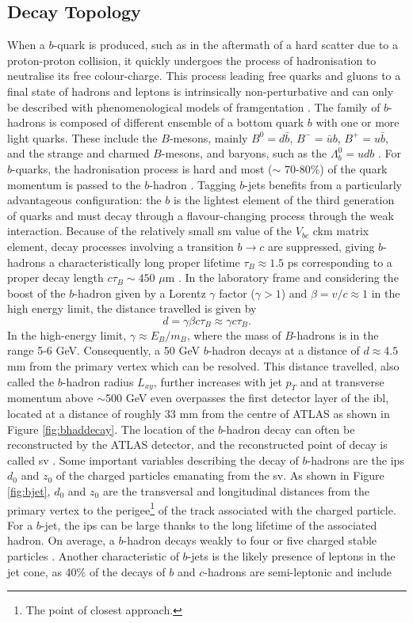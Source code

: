 \subsection{Decay Topology}
When a $b$-quark is produced, such as in the aftermath of a hard scatter due to a proton-proton collision, it quickly undergoes the process of hadronisation to neutralise its free colour-charge. This process leading free quarks and gluons to a final state of hadrons and leptons is intrinsically non-perturbative and can only be described with phenomenological models of framgentation \cite{Webber:419784}. The family of $b$-hadrons is composed of different ensemble of a bottom quark $b$ with one or more light quarks. These include the $B$-mesons, mainly $B^0=d\bar{b}$, $B^-=\bar{u}b$, $B^+=u\bar{b}$, and the strange and charmed $B$-mesons, and baryons, such as the $\Lambda_b^0=udb$ \cite{ATL-PHYS-PUB-2014-008}. For $b$-quarks, the hadronisation process is hard and most ($\sim$ 70-80\%) of the quark momentum is passed to the $b$-hadron \cite{Webber:419784}. Tagging $b$-jets benefits from a particularly advantageous configuration: the $b$ is the lightest element of the third generation of quarks and must decay through a flavour-changing process through the weak interaction. Because of the relatively small \gls{sm} value of the $V_{bc}$ \gls{ckm} matrix element, decay processes involving a transition $b \rightarrow c$ are suppressed, giving $b$-hadrons a characteristically long proper lifetime $\tau_B \approx 1.5$ ps corresponding to a proper decay length $c\tau_{B} \sim 450$ $\mu$m \cite{Tanabashi:2018oca}. In the laboratory frame and considering the boost of the $b$-hadron given by a Lorentz $\gamma$ factor ($\gamma > 1$) and $\beta = v/c \approx 1$ in the high energy limit, the distance travelled is given by \[d = \gamma \beta c \tau_B \approx \gamma c \tau_B.\] In the high-energy limit, $\gamma \approx E_B / m_B$, where the mass of $B$-hadrons is in the range 5-6 GeV. Consequently, a 50 GeV $b$-hadron decays at a distance of $d \approx 4.5$ mm from the primary vertex which can be resolved. This distance travelled, also called the $b$-hadron radius $L_{xy}$, further increases with jet $p_T$ and at transverse momentum above $\sim$500 GeV even overpasses the first detector layer of the \gls{ibl}, located at a distance of roughly 33 mm from the centre of ATLAS as shown in Figure \ref{fig:bhaddecay}. The location of the $b$-hadron decay can often be reconstructed by the ATLAS detector, and the reconstructed point of decay is called \gls{sv} \cite{Aad:2019aic}. Some important variables describing the decay of $b$-hadrons are the \glspl{ip} $d_0$ and $z_0$ of the charged particles emanating from the \gls{sv}. As shown in Figure \ref{fig:bjet}, $d_0$ and $z_0$ are the transversal and longitudinal distances from the primary vertex to the perigee\footnote{The point of closest approach.} of the track associated with the charged particle. For a $b$-jet, the \glspl{ip} can be large thanks to the long lifetime of the associated hadron. On average, a $b$-hadron decays weakly to four or five charged stable particles \cite{ATL-PHYS-PUB-2014-008}. Another characteristic of $b$-jets is the likely presence of leptons in the jet cone, as 40\% of the decays of $b$ and $c$-hadrons are semi-leptonic and include 